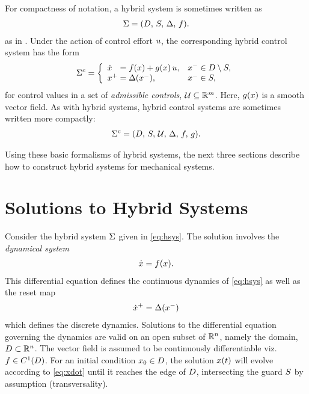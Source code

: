 %
For compactness of notation, a hybrid system is sometimes written as
\begin{align*}
  \Sigma = (D, \, S, \, \Delta, \, f).
\end{align*}
as in \cite{Sinnet2009}.
%
Under the action of control effort $u$, the corresponding hybrid control
system has the form
%
\begin{align}
  \HCS = \left\{
  \begin{array}{l l}
    \dx\hphantom{^{+}} = \xf\arx + \xg\arx \, \uu, & \xm \in \D \setminus \Guard,\\
    \xp = \Delta(\xm), & \xm \in \Guard,
  \end{array}\right.
  \label{eq:hcsys}
\end{align}
%
for control values in a set of {\em admissible controls}, $\mathcal{U} \subseteq
\mathbb{R}^{m}$.
%
Here, $g(x)$ is a smooth vector field.
%
As with hybrid systems, hybrid control systems are sometimes written more
compactly:
%
\begin{align*}
  \Sigma^{c} = (D, \, S, \, \mathcal{U}, \, \Delta, \, f, \, g).
\end{align*}

Using these basic formalisms of hybrid systems, the next three sections describe
how to construct hybrid systems for mechanical systems.


\section{Solutions to Hybrid Systems} \label{sec:hsys-sol}

Consider the hybrid system $\Sigma$ given in \eqref{eq:hsys}.
%
The solution involves the {\em dynamical system}
\begin{align}
  \label{eq:xdot}
  {\dot {x}} = f(x).
\end{align}
This differential equation defines the continuous dynamics of \eqref{eq:hsys} as
well as the reset map
\begin{align}
  \label{eq:rmap}
  {\dot {x}}^{+} = \Delta(x^{-})
\end{align}
which defines the discrete dynamics.
%
Solutions to the differential equation governing the dynamics are valid on an
open subset of $\mathbb{R}^{n}$, namely the domain, $D \subset \mathbb{R}^{n}$.
%
The vector field is assumed to be continuously differentiable viz. $f \in
C^{1}(D)$.
%
For an initial condition $x_{0} \in D$, the solution $x(t)$ will evolve
according to \eqref{eq:xdot} until it reaches the edge of $D$, intersecting
the guard $S$ by assumption (transversality).

